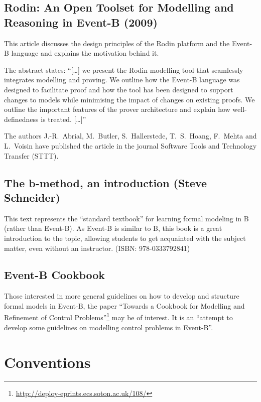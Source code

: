 \documentclass[twoside,10pt]{book}
\begin{document}
\subsection{Rodin: An Open Toolset for Modelling and Reasoning in Event-B (2009)}
\label{abrialBHHMV_2009}

This article discusses the design principles of the Rodin platform and the Event-B language and 
explains the motivation behind it.

The abstract states: ``[\ldots] we present the Rodin modelling tool that seamlessly integrates modelling and proving. 
 We outline how the Event-B language was designed to facilitate proof and how the tool has been designed to support changes to 
 models while minimising the impact of changes on existing proofs. 
 We outline the important features of the prover architecture and explain how well-definedness is treated. [\ldots]''

The authors J.-R.~Abrial, M.~Butler, S.~Hallerstede, T.~S.~Hoang, F.~Mehta and L.~Voisin have published the article in the journal Software Tools and Technology Transfer (STTT).

\subsection{The b-method, an introduction (Steve Schneider)}
\label{schneider_book}

This text represents the ``standard textbook'' for learning formal modeling in B (rather than Event-B).  As Event-B is similar to B, this book is a great introduction to the topic, allowing students to get acquainted with the subject matter, even without an instructor. (ISBN: 978-0333792841)

\subsection{Event-B Cookbook}

Those interested in more general guidelines on how to develop and structure formal models in Event-B, the paper ``Towards a Cookbook for Modelling and Refinement of Control Problems''\footnote{\url{http://deploy-eprints.ecs.soton.ac.uk/108/}} may be of interest.  It is an ``attempt to develop some guidelines on modelling control problems in Event-B''. 

\section{Conventions}
\label{conventions}
\end{document}
